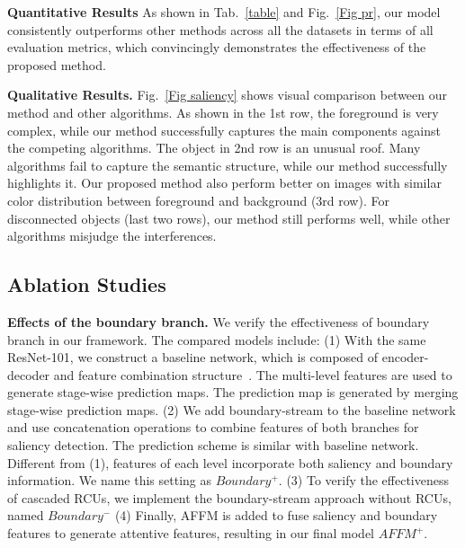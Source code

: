 \documentclass[journal]{IEEEtran}
\begin{document}
\textbf{Quantitative Results}
As shown in Tab.~\ref{table} and Fig.~\ref{Fig pr}, our model consistently outperforms other methods across all the datasets in terms of all evaluation metrics, which convincingly demonstrates the effectiveness of the proposed method.
%

\textbf{Qualitative Results.}
Fig.~\ref{Fig saliency} shows visual comparison between our method and other algorithms.
%
As shown in the 1st row, the foreground is very complex, while our method successfully captures the main components against the competing algorithms.
%
The object in 2nd row is an unusual roof. Many algorithms fail to capture the semantic structure, while our method successfully highlights it. Our proposed method also perform better on images with similar color distribution between foreground and background (3rd row). For disconnected objects (last two rows), our method still performs well, while other algorithms misjudge the interferences.
\vspace{-2mm}
\subsection{Ablation Studies}{\bf{Effects of the boundary branch.}} We verify the effectiveness of boundary branch in our framework.
%
The compared models include:
(1) With the same ResNet-101, we construct a baseline network, which is composed of encoder-decoder and feature combination structure~\cite{Zhang2017Amulet}.
%
The multi-level features are used to generate stage-wise prediction maps. The prediction map is generated by merging stage-wise prediction maps.
%
(2) We add boundary-stream to the baseline network and use concatenation operations to combine features of both branches for saliency detection.
%
The prediction scheme is similar with baseline network.
%
Different from (1), features of each level incorporate both saliency and boundary information. We name this setting as $Boundary^{+}$.
%
(3) To verify the effectiveness of cascaded RCUs, we implement the boundary-stream approach without RCUs, named $Boundary^{-}$
%
(4) Finally, AFFM is added to fuse saliency and boundary features to generate attentive features, resulting in our final model $AFFM^{+}$.
\end{document}
